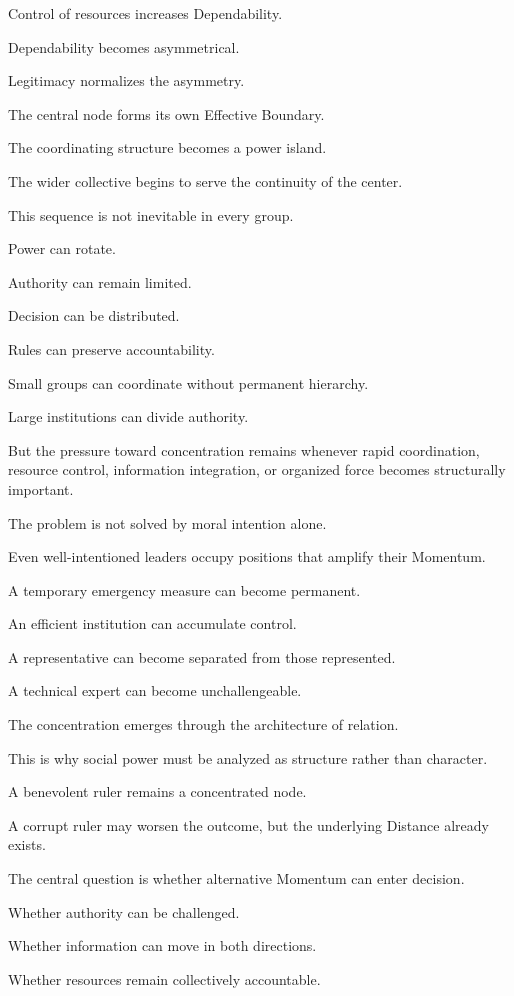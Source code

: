 Control of resources increases Dependability.

Dependability becomes asymmetrical.

Legitimacy normalizes the asymmetry.

The central node forms its own Effective Boundary.

The coordinating structure becomes a power island.

The wider collective begins to serve the continuity of the center.

This sequence is not inevitable in every group.

Power can rotate.

Authority can remain limited.

Decision can be distributed.

Rules can preserve accountability.

Small groups can coordinate without permanent hierarchy.

Large institutions can divide authority.

But the pressure toward concentration remains whenever rapid coordination, resource control, information integration, or organized force becomes structurally important.

The problem is not solved by moral intention alone.

Even well-intentioned leaders occupy positions that amplify their Momentum.

A temporary emergency measure can become permanent.

An efficient institution can accumulate control.

A representative can become separated from those represented.

A technical expert can become unchallengeable.

The concentration emerges through the architecture of relation.

This is why social power must be analyzed as structure rather than character.

A benevolent ruler remains a concentrated node.

A corrupt ruler may worsen the outcome, but the underlying Distance already exists.

The central question is whether alternative Momentum can enter decision.

Whether authority can be challenged.

Whether information can move in both directions.

Whether resources remain collectively accountable.


